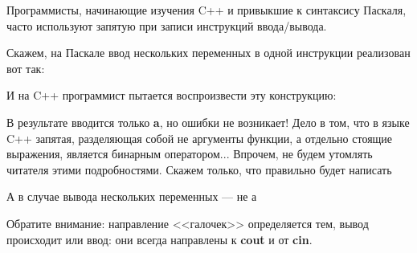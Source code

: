 \begin{typerror}
	\label{TE_cin-cout-comma}

	Программисты, начинающие изучения C++ и привыкшие к синтаксису Паскаля,
	часто используют запятую при записи инструкций ввода/вывода.

	Скажем, на Паскале ввод нескольких переменных в одной инструкции реализован вот так:

	И на C++ программист пытается воспроизвести эту конструкцию:


	В результате вводится только \textbf{a}, но ошибки не возникает!
	Дело в том, что в языке C++ запятая, разделяющая собой не аргументы функции,
	а отдельно стоящие выражения, является бинарным оператором...
	Впрочем, не будем утомлять читателя этими подробностями.
	Скажем только, что правильно будет написать

	А в случае вывода нескольких переменных --- не
	а

	Обратите внимание: направление <<галочек>> определяется тем, вывод происходит или ввод:
	они всегда направлены к \textbf{cout} и от \textbf{cin}.

\end{typerror}
